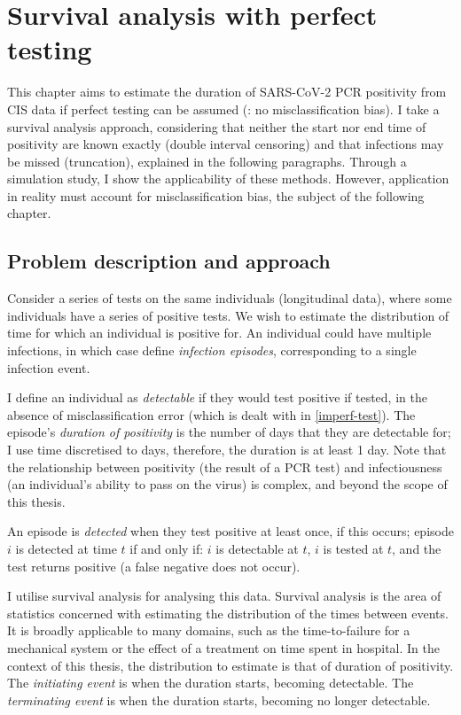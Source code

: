 \documentclass[main.tex]{subfiles}
\begin{document}
\chapter{Survival analysis with perfect testing} \label{perf-test}

This chapter aims to estimate the duration of SARS-CoV-2 PCR positivity from CIS data if perfect testing can be assumed (\ie: no misclassification bias).
I take a survival analysis approach, considering that neither the start nor end time of positivity are known exactly (double interval censoring) and that infections may be missed (truncation), explained in the following paragraphs.
Through a simulation study, I show the applicability of these methods.
However, application in reality must account for misclassification bias, the subject of the following chapter.

\section{Problem description and approach}\label{perf-test:sec:data}

Consider a series of tests on the same individuals (longitudinal data), where some individuals have a series of positive tests.
We wish to estimate the distribution of time for which an individual is positive for.
An individual could have multiple infections, in which case define \emph{infection episodes}, corresponding to a single infection event.

I define an individual as \emph{detectable} if they would test positive if tested, in the absence of misclassification error (which is dealt with in \autoref{imperf-test}).
The episode's \emph{duration of positivity} is the number of days that they are detectable for; I use time discretised to days, therefore, the duration is at least 1 day.
Note that the relationship between positivity (\ie the result of a PCR test) and infectiousness (\ie an individual's ability to pass on the virus) is complex,  and beyond the scope of this thesis.

An episode is \emph{detected} when they test positive at least once, if this occurs; episode $i$ is detected at time $t$ if and only if: $i$ is detectable at $t$, $i$ is tested at $t$, and the test returns positive (a false negative does not occur).

I utilise survival analysis for analysing this data.
Survival analysis is the area of statistics concerned with estimating the distribution of the times between events.
It is broadly applicable to many domains, such as the time-to-failure for a mechanical system or the effect of a treatment on time spent in hospital.
In the context of this thesis, the distribution to estimate is that of duration of positivity.
The \emph{initiating event} is when the duration starts, \ie becoming detectable.
The \emph{terminating event} is when the duration starts, \ie becoming no longer detectable.
\end{document}
